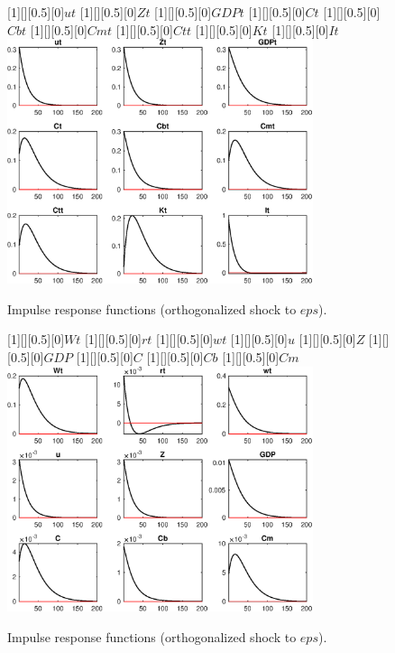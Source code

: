  
\begin{figure}[H]
[1][][0.5][0]{$ut$}
[1][][0.5][0]{$Zt$}
[1][][0.5][0]{$GDPt$}
[1][][0.5][0]{$Ct$}
[1][][0.5][0]{$Cbt$}
[1][][0.5][0]{$Cmt$}
[1][][0.5][0]{$Ctt$}
[1][][0.5][0]{$Kt$}
[1][][0.5][0]{$It$}
\centering 
\includegraphics[width=0.80\textwidth]{DyTruncation/graphs/DyTruncation_IRF_eps1}
\caption{Impulse response functions (orthogonalized shock to $eps$).}\label{Fig:IRF:eps:1}
\end{figure}
 
\begin{figure}[H]
[1][][0.5][0]{$Wt$}
[1][][0.5][0]{$rt$}
[1][][0.5][0]{$wt$}
[1][][0.5][0]{$u$}
[1][][0.5][0]{$Z$}
[1][][0.5][0]{$GDP$}
[1][][0.5][0]{$C$}
[1][][0.5][0]{$Cb$}
[1][][0.5][0]{$Cm$}
\centering 
\includegraphics[width=0.80\textwidth]{DyTruncation/graphs/DyTruncation_IRF_eps2}
\caption{Impulse response functions (orthogonalized shock to $eps$).}\label{Fig:IRF:eps:2}
\end{figure}
 
